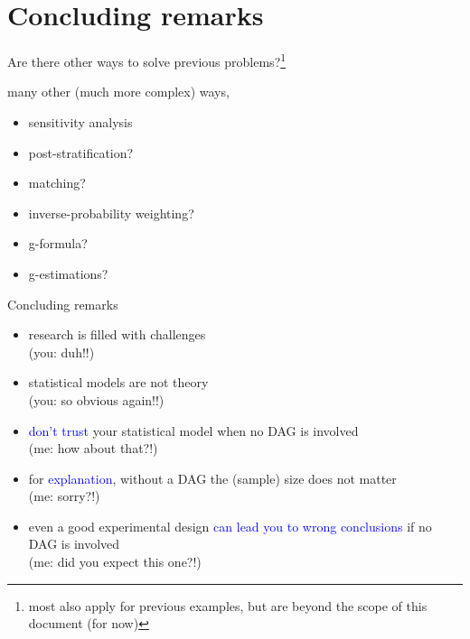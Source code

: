 \section{Concluding remarks}
%
\begin{frame}[negative]
	\sectionpage
\end{frame}
%
%
\begin{frame}
	{Are there other ways to solve previous problems?\footnote{most also apply for previous examples, but are beyond the scope of this document (for now)}}
	
	many other (much more complex) ways,
	\begin{itemize}
		\item sensitivity analysis \\
		\item post-stratification? \\
		\item matching?
		\item inverse-probability weighting?
		\item g-formula?
		\item g-estimations?
	\end{itemize}
\end{frame}
%
%
\begin{lhframe}[rhgraphic={\texttt{[image: think1.jpg]}}]
	{Concluding remarks}
	
	\begin{itemize}
		\item research is filled with challenges \\
		{\small (you: duh!!) }
		\item statistical models are not theory \\
		{\small (you: so obvious again!!) }
		\item \textcolor{blue}{don't trust} your statistical model when no DAG is involved \\
		{\small (me: how about that?!) }
		\item for \textcolor{blue}{explanation}, without a DAG the (sample) size does not matter \\
		{\small (me: sorry?!) }
		\item even a good experimental design \textcolor{blue}{can lead you to wrong conclusions} if no DAG is involved \\
		{\small (me: did you expect this one?!)}
	\end{itemize} 
\end{lhframe}
